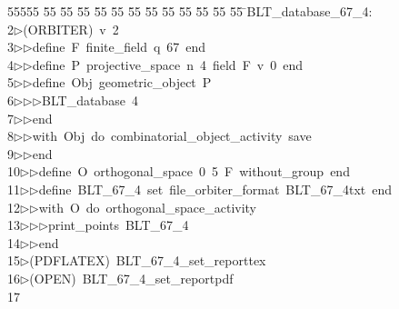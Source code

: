 %
%
\begin{tabbing}
55555 \= 55 \= 55 \= 55 \= 55 \= 55 \= 55 \= 55 \= 55 \= 55 \= 55 \= 55 \= 55 \= \>BLT\_database\_67\_4:\\[0pt]
2\>$\triangleright$\>(ORBITER)\ v\ 2\ \\[0pt]
3\>$\triangleright$\>$\triangleright$\>define\ F\ finite\_field\ q\ 67\ end\ \\[0pt]
4\>$\triangleright$\>$\triangleright$\>define\ P\ projective\_space\ n\ 4\ field\ F\ v\ 0\ end\ \\[0pt]
5\>$\triangleright$\>$\triangleright$\>define\ Obj\ geometric\_object\ P\ \\[0pt]
6\>$\triangleright$\>$\triangleright$\>$\triangleright$\>BLT\_database\ 4\ \\[0pt]
7\>$\triangleright$\>$\triangleright$\>end\ \\[0pt]
8\>$\triangleright$\>$\triangleright$\>with\ Obj\ do\ combinatorial\_object\_activity\ save\ \\[0pt]
9\>$\triangleright$\>$\triangleright$\>end\ \\[0pt]
10\>$\triangleright$\>$\triangleright$\>define\ O\ orthogonal\_space\ 0\ 5\ F\ without\_group\ end\ \\[0pt]
11\>$\triangleright$\>$\triangleright$\>define\ BLT\_67\_4\ set\ file\_orbiter\_format\ BLT\_67\_4txt\ end\ \\[0pt]
12\>$\triangleright$\>$\triangleright$\>with\ O\ do\ orthogonal\_space\_activity\ \\[0pt]
13\>$\triangleright$\>$\triangleright$\>$\triangleright$\>print\_points\ BLT\_67\_4\ \\[0pt]
14\>$\triangleright$\>$\triangleright$\>end\\[0pt]
15\>$\triangleright$\>(PDFLATEX)\ BLT\_67\_4\_set\_reporttex\\[0pt]
16\>$\triangleright$\>(OPEN)\ BLT\_67\_4\_set\_reportpdf\\[0pt]
17\>\end{tabbing}
